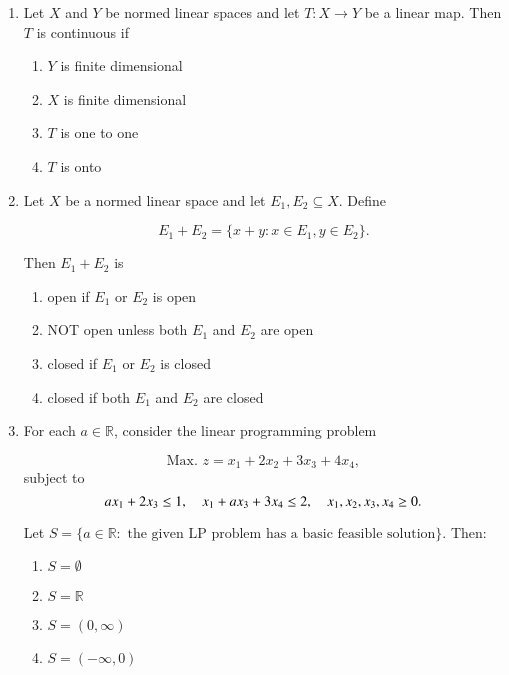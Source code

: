 \documentclass[journal]{IEEEtran}
\numberwithin{figure}{enumi}
\begin{document}
\begin{enumerate}
\item Let $X$ and $Y$ be normed linear spaces and let $T: X \to Y$ be a linear map. Then $T$ is continuous if

\begin{enumerate}
    \item $Y$ is finite dimensional
    \item $X$ is finite dimensional
    \item $T$ is one to one
    \item $T$ is onto
\end{enumerate}
\item Let $X$ be a normed linear space and let $E_1, E_2 \subseteq X$. Define

\begin{equation*}
E_1 + E_2 = \{ x+y : x \in E_1, y \in E_2 \}.
\end{equation*}

Then $E_1 + E_2$ is

\begin{enumerate}
    \item open if $E_1$ or $E_2$ is open
    \item NOT open unless both $E_1$ and $E_2$ are open
    \item closed if $E_1$ or $E_2$ is closed
    \item closed if both $E_1$ and $E_2$ are closed
\end{enumerate}

\item For each $a \in \mathbb{R}$, consider the linear programming problem

\begin{equation*}
\text{Max. } z = x_1 + 2x_2 + 3x_3 + 4x_4,
\end{equation*}
subject to
\begin{equation*}
a x_1 + 2 x_3 \leq 1,\\ \quad x_1 + a x_3 + 3 x_4 \leq 2,\\ \quad x_1, x_2, x_3, x_4 \geq 0.
\end{equation*}

Let $S = \{ a \in \mathbb{R}: \text{ the given LP problem has a basic feasible solution} \}$. Then:

\begin{enumerate}
    \item $S = \emptyset$
    \item $S = \mathbb{R}$
    \item $S = (0, \infty)$
    \item $S = (-\infty, 0)$
\end{enumerate}


\end{enumerate}
\end{document}
